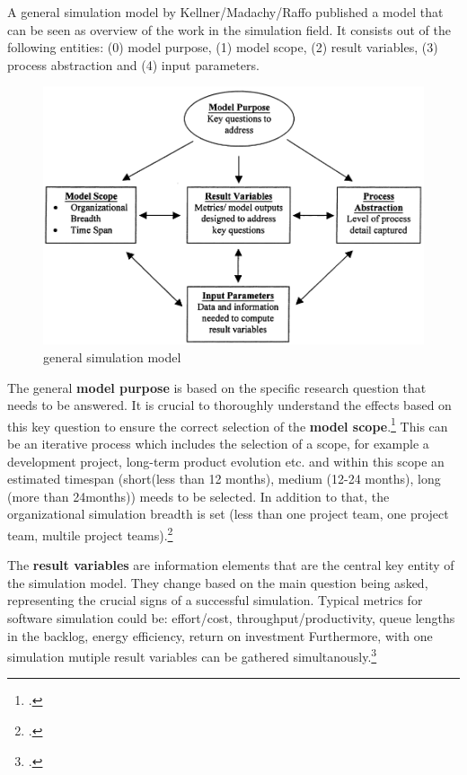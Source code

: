 A general simulation model by Kellner/Madachy/Raffo published a model that can be seen as overview of the work in the simulation field.
It consists out of the following entities: (0) model purpose, (1) model scope, (2) result variables, (3) process abstraction and (4) input parameters.  

\begin{figure}[H]
    \centering
    \includegraphics[width=0.7\linewidth]{graphics/Simulation_Modell.png}
    \caption{general simulation model\protect\footnotemark}
    \label{simulation_Modell}
\end{figure}

The general \textbf{model purpose} is based on the specific research question that needs to be answered.
It is crucial to thoroughly understand the effects based on this key question to ensure the correct selection of the \textbf{model scope}.\footcite[cf.][95]{kellnerSoftwareProcessSimulation1999}
This can be an iterative process which includes the selection of a scope, for example a development project, long-term product evolution etc. and within 
this scope an estimated timespan (short(less than 12 months), medium (12-24 months), long (more than 24months)) meeds to be selected. 
In addition to that, the organizational simulation breadth is set (less than one project team, one project team, multile project teams).\footcite[cf.][96]{kellnerSoftwareProcessSimulation1999}

The \textbf{result variables} are information elements that are the central key entity of the simulation model. 
They change based on the main question being asked, representing the crucial signs of a successful simulation.
Typical metrics for software simulation could be: effort/cost, throughput/productivity, queue lengths in the backlog,
energy efficiency, return on investment
Furthermore, with one simulation mutiple result variables can be gathered simultanously.\footcite[cf.][96-97]{kellnerSoftwareProcessSimulation1999}

